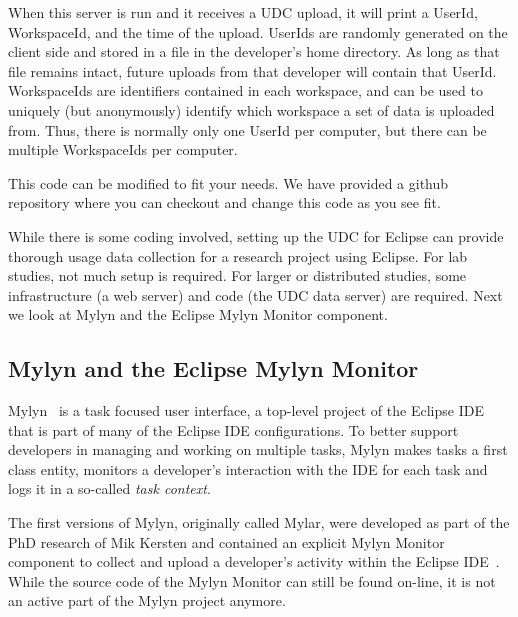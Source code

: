 \noindent
When this server is run and it receives a UDC upload,
it will print a UserId, WorkspaceId, and the time of the upload.
UserIds are randomly generated on the client side and stored in a file in
the developer's home directory.
As long as that file remains intact, future uploads from that developer will
contain that UserId.
WorkspaceIds are identifiers contained in each workspace, and can be
used to uniquely (but anonymously) identify which
workspace a set of data is uploaded from.
Thus, there is normally only one UserId per computer, but there can
be multiple WorkspaceIds per computer.

This code can be modified to fit your needs.
We have provided a github repository where you can checkout
and change this code as you see fit.

\vspace{0.1in}
While there is some coding involved, setting up the UDC for Eclipse can provide thorough usage data collection for a research project using Eclipse.   For lab studies, not much setup is required.  For larger or distributed studies, some infrastructure (a web server) and code (the UDC data server) are required.  Next we look at Mylyn and the Eclipse Mylyn Monitor component.

\subsection{Mylyn and the Eclipse Mylyn Monitor}
\label{MylynMonitor}



Mylyn~\cite{mylyn-web,Kersten-Mylar2005,Kersten-Mylin,kersten2007focusing} is a task focused user interface, a top-level project of the Eclipse IDE that is part of many of the Eclipse IDE configurations. To better support developers in managing and working on multiple tasks, Mylyn makes tasks a first class entity, monitors a developer's interaction with the IDE for each task and logs it in a so-called \textit{task context}.

The first versions of Mylyn, originally called Mylar, were developed as part of the PhD research of Mik Kersten and contained an explicit Mylyn Monitor component to collect and upload a developer's activity within the Eclipse IDE~\cite{mylyn-monitor}. While the source code of the Mylyn Monitor can still be found on-line, it is not an active part of the Mylyn project anymore.


